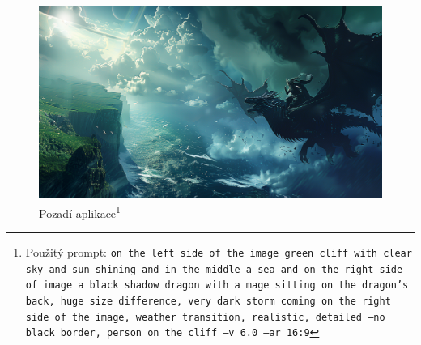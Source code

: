 \begin{figure}
  \begin{minipage}{\textwidth}
    \centering
    \includegraphics[width=\textwidth]{resources/figures/background.png}
    \caption[Pozadí aplikace]{Pozadí aplikace\footnote[3]{Použitý prompt: \texttt{on the left side of the image green cliff with clear sky and sun shining and in the middle a sea and on the right side of image a black shadow dragon with a mage sitting on the dragon's back, huge size difference, very dark storm coming on the right side of the image, weather transition, realistic, detailed --no black border, person on the cliff --v 6.0 --ar 16:9}}}
    \label{fig:background}
  \end{minipage}
\end{figure}

